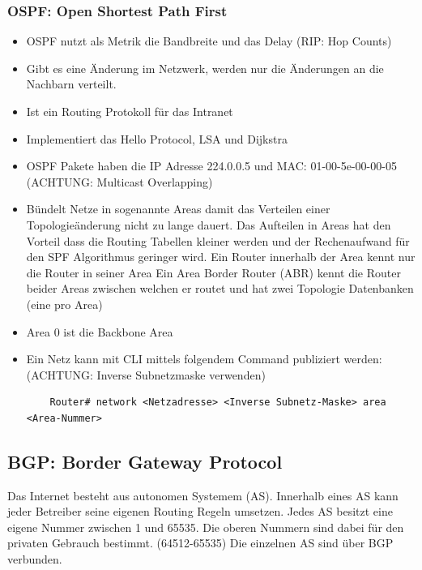 \subsubsection{OSPF: Open Shortest Path First}
\begin{itemize}
	\item OSPF nutzt als Metrik die Bandbreite und das Delay (RIP: Hop Counts)
	\item Gibt es eine Änderung im Netzwerk, werden nur die Änderungen an die Nachbarn verteilt.
	\item Ist ein Routing Protokoll für das Intranet
	\item Implementiert das Hello Protocol, LSA und Dijkstra
	\item OSPF Pakete haben die IP Adresse 224.0.0.5 und MAC: 01-00-5e-00-00-05 (ACHTUNG: Multicast Overlapping)
	\item Bündelt Netze in sogenannte Areas damit das Verteilen einer Topologieänderung nicht zu lange dauert. Das Aufteilen in Areas hat den Vorteil dass die Routing Tabellen kleiner werden und der Rechenaufwand für den SPF Algorithmus geringer wird.
	\subitem Ein Router innerhalb der Area kennt nur die Router in seiner Area
	\subitem Ein Area Border Router (ABR) kennt die Router beider Areas zwischen welchen er routet und hat zwei Topologie Datenbanken (eine pro Area)
	\item Area 0 ist die Backbone Area
	\item Ein Netz kann mit CLI mittels folgendem Command publiziert werden: (ACHTUNG: Inverse Subnetzmaske verwenden)
	\begin{lstlisting}
	Router# network <Netzadresse> <Inverse Subnetz-Maske> area <Area-Nummer>\end{lstlisting}	
\end{itemize}

\subsection{BGP: Border Gateway Protocol}
Das Internet besteht aus autonomen Systemem (AS). Innerhalb eines AS kann jeder Betreiber seine eigenen Routing Regeln umsetzen. Jedes AS besitzt eine eigene Nummer zwischen 1 und 65535. Die oberen Nummern sind dabei für den privaten Gebrauch bestimmt. (64512-65535) Die einzelnen AS sind über BGP verbunden. 

